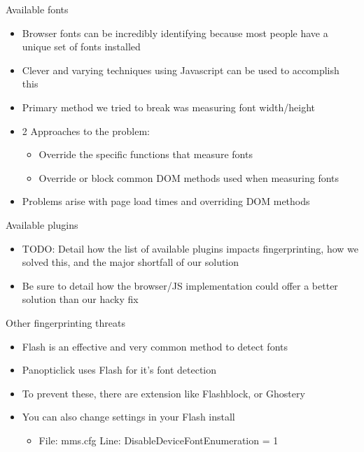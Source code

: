 \begin{frame}[fragile,t]{Available fonts}
	\begin{itemize}
		\item Browser fonts can be incredibly identifying because most people have a unique set of fonts installed
		\item Clever and varying techniques using Javascript can be used to accomplish this
		\item Primary method we tried to break was measuring font width/height
		\item 2 Approaches to the problem:
			\begin{itemize}
				\item Override the specific functions that measure fonts
				\item Override or block common DOM methods used when measuring fonts
			\end{itemize}
		\item Problems arise with page load times and overriding DOM methods	
	\end{itemize}
\end{frame}

\begin{frame}[fragile,t]{Available plugins}
	\begin{itemize}
		\item TODO: Detail how the list of available plugins impacts fingerprinting, how we solved this, and the major shortfall of our solution
		\item Be sure to detail how the browser/JS implementation could offer a better solution than our hacky fix
	\end{itemize}
\end{frame}

\begin{frame}[fragile,t]{Other fingerprinting threats}
	\begin{itemize}
		\item Flash is an effective and very common method to detect fonts
		\item Panopticlick uses Flash for it's font detection
		\item To prevent these, there are extension like Flashblock, or Ghostery
		\item You can also change settings in your Flash install
		\begin{itemize}
			\item File: mms.cfg Line: DisableDeviceFontEnumeration = 1
		\end{itemize}
	\end{itemize}
\end{frame}


